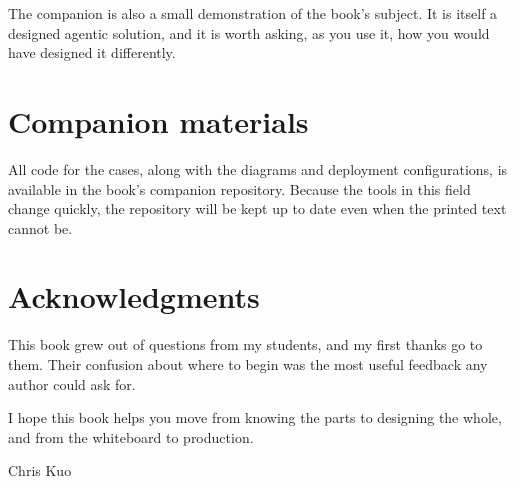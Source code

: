 The companion is also a small demonstration of the book's subject. It is itself
a designed agentic solution, and it is worth asking, as you use it, how you
would have designed it differently.

\section*{Companion materials}

All code for the cases, along with the diagrams and deployment
configurations, is available in the book's companion repository. Because the
tools in this field change quickly, the repository will be kept up to date even
when the printed text cannot be.


\section*{Acknowledgments}

This book grew out of questions from my students, and my first thanks go to
them. Their confusion about where to begin was the most useful feedback any
author could ask for.


I hope this book helps you move from knowing the parts to designing the whole,
and from the whiteboard to production.

\vspace{2em}
\begin{flushright}
Chris Kuo\\
\end{flushright}
